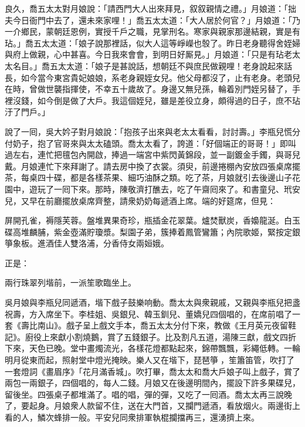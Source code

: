 良久，喬五太太對月娘說：「請西門大人出來拜見，叙叙親情之禮。」月娘道：「拙夫今日衙門中去了，還未來家哩！」喬五太太道：「大人居於何官？」月娘道：「乃一介鄉民，蒙朝廷恩例，實授千戶之職，見掌刑名。寒家與親家那邊結親，實是有玷。」喬五太太道：「娘子說那裡話，似大人這等崢嶸也彀了。昨日老身聽得舍姪婦與府上做親，心中甚喜。今日我來會會，到明日好厮見。」月娘道：「只是有玷老太太名目。」喬五太太道：「娘子是甚說話，想朝廷不與庶民做親哩！老身說起來話長，如今當今東宮貴妃娘娘，系老身親姪女兒。他父母都沒了，止有老身。老頭兒在時，曾做世襲指揮使，不幸五十歲故了。身邊又無兒孫，輪着別門姪另替了，手裡沒錢，如今倒是做了大戶。我這個姪兒，雖是差役立身，頗得過的日子，庶不玷汙了門戶。」

說了一囘，吳大妗子對月娘說：「抱孩子出來與老太太看看，討討壽。」李瓶兒慌分付奶子，抱了官哥來與太太磕頭。喬太太看了，誇道：「好個端正的哥哥！」即叫過左右，連忙把氊包內開啟，捧過一端宮中紫閃黃錦段，並一副鍍金手鐲，與哥兒戴。月娘連忙下來拜謝了。請去房中換了衣裳。須臾，前邊捲棚內安放四張桌席擺茶，每桌四十碟，都是各樣茶果、細巧油酥之類。吃了茶，月娘就引去後邊山子花園中，遊玩了一囘下來。那時，陳敬濟打醮去，吃了午齋囘來了。和書童兒、玳安兒，又早在前廳擺放桌席齊整，請衆奶奶每遞酒上席。端的好筵席，但見：

\begin{myquote}
屏開孔雀，褥隱芙蓉。盤堆異果奇珍，瓶插金花翠葉。爐焚獸炭，香嬝龍涎。白玉碟高堆麟脯，紫金壺滿貯瓊漿。梨園子弟，簇捧着鳳管鸞簫；內院歌姬，緊按定銀箏象板。進酒佳人雙洛浦，分香侍女兩姮娥。
\end{myquote}

正是：

\begin{myquote}
兩行珠翠列堦前，一派笙歌臨坐上。
\end{myquote}

吳月娘與李瓶兒同遞酒，堦下戲子鼓樂响動。喬太太與衆親戚，又親與李瓶兒把盞祝壽，方入席坐下。李桂姐、吳銀兒、韓玉釧兒、董嬌兒四個唱的，在席前唱了一套《壽比南山》。戲子呈上戲文手本，喬五太太分付下來，教做《王月英元夜留鞋記》。{}廚役上來獻小割燒鵝，賞了五錢銀子。比及割凡五道，湯陳三獻，戲文四折下來，天色已晚。堂中畫燭流光，各樣花燈都點起來，錦帶飄飄，彩繩低轉。一輪明月從東而起，照射堂中燈光掩映。樂人又在堦下，琵琶箏𥱧，笙簫笛管，吹打了一套燈詞《畫眉序》「花月滿香城」。吹打畢，喬太太和喬大戶娘子叫上戲子，賞了兩包一兩銀子，四個唱的，每人二錢。月娘又在後邊明間內，擺設下許多果碟兒，留後坐。四張桌子都堆滿了。唱的唱，彈的彈，又吃了一囘酒。喬太太再三說晚了，要起身。月娘衆人款留不住，送在大門首，又攔門遞酒，看放烟火。兩邊街上看的人，鱗次蜂排一般。平安兒同衆排軍執棍攔擋再三，還湧擠上來。


